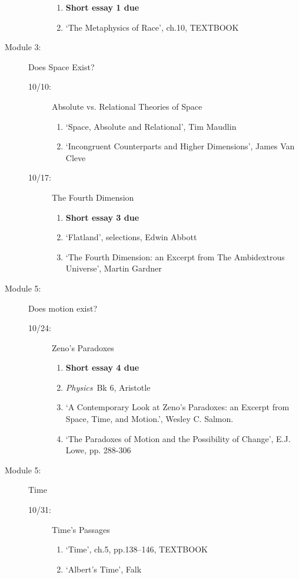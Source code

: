 \documentclass[article,oneside]{memoir}
\begin{document}
\begin{description}
\begin{description}
\begin{enumerate}
\item \textbf{Short essay 1 due}

\item `The Metaphysics of Race', ch.10, TEXTBOOK

\end{enumerate}

\end{description}


\item[Module 3:] Does Space Exist? 
\begin{description}
\item[10/10:] Absolute vs. Relational Theories of Space
\begin{enumerate}
\item `Space, Absolute and Relational', Tim Maudlin
\item `Incongruent Counterparts and Higher Dimensions', James Van Cleve
\end{enumerate}

\item[10/17:] The Fourth Dimension
\begin{enumerate} 
\item \textbf{Short essay 3 due}
\item `Flatland', selections, Edwin Abbott 
\item `The Fourth Dimension: an Excerpt from The Ambidextrous Universe', Martin Gardner
\end{enumerate}
\end{description}

\item[Module 5:] Does motion exist? 
\begin{description}
\item [10/24:] Zeno's Paradoxes
\begin{enumerate}
\item \textbf{Short essay 4 due}
\item \emph{Physics}\ Bk 6, Aristotle
\item `A Contemporary Look at Zeno’s Paradoxes: an Excerpt from Space, Time, and Motion.', Wesley C. Salmon. 
\item `The Paradoxes of Motion and the Possibility of Change', E.J. Lowe, pp. 288-306
\end{enumerate}
\end{description}


\item[Module 5:] Time 
\begin{description}
\item [10/31:] Time's Passages
\begin{enumerate}
\item `Time', ch.5, pp.138--146, TEXTBOOK
\item `Albert's Time', Falk
\end{enumerate}


\end{description}
\end{description}
\end{document}

